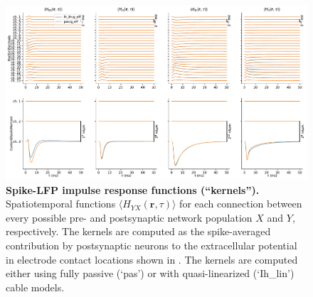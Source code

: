 \begin{figure}[!ht]
\begin{center}
\includegraphics[width=\textwidth]{Figures/Ch-LFPy/Ch-LFPy-kernels.pdf}
\end{center}
\caption{\textbf{Spike-LFP impulse response functions (``kernels'').}
Spatiotemporal functions $\langle H_{YX}(\mathbf{r}, \tau) \rangle$ for each connection between every possible pre- and postsynaptic network population $X$ and $Y$, respectively.
The kernels are computed as the spike-averaged contribution by postsynaptic neurons to the extracellular potential in electrode contact locations shown in .
The kernels are computed either using fully passive (`pas') or with quasi-linearized (`Ih\_lin') cable models.
}
\label{fig:LFPy_kernels}
\end{figure}


